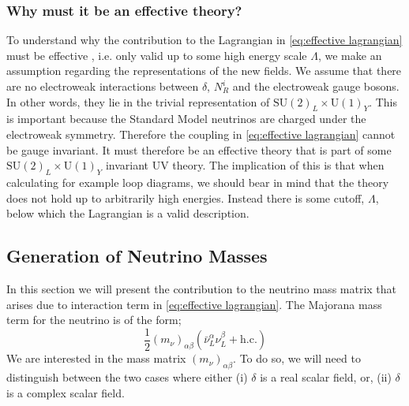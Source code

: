 \documentclass[11pt]{article}
\numberwithin{equation}{section}
\numberwithin{figure}{section}
\numberwithin{table}{section}
\newcommand{\SU}[1]{\textrm{SU}\left(#1\right)}
\newcommand{\Uni}[1]{\textrm{U}\left(#1\right)}
\begin{document}
\subsubsection{Why must it be an effective theory?}\label{sec:why effective}
To understand why the contribution to the Lagrangian in \eqref{eq:effective lagrangian} must be effective \cite{Farzan2009, Farzan2010a}, i.e. only valid up to some high energy scale $\Lambda$, we make an assumption regarding the representations of the new fields. We assume that there are no electroweak interactions between $\delta$, $N^i_R$ and the electroweak gauge bosons. In other words, they lie in the trivial representation of $\SU{2}_L \times \Uni{1}_Y$. This is important because the Standard Model neutrinos are charged under the electroweak symmetry. Therefore the coupling in \eqref{eq:effective lagrangian} cannot be gauge invariant. It must therefore be an effective theory that is part of some $\SU{2}_L \times \Uni{1}_Y$ invariant UV theory. The implication of this is that when calculating for example loop diagrams, we should bear in mind that the theory does not hold up to arbitrarily high energies. Instead there is some cutoff, $\Lambda$, below which the Lagrangian is a valid description.



\subsection{Generation of Neutrino Masses}



In this section we will present the contribution to the neutrino mass matrix that arises due to interaction term in \eqref{eq:effective lagrangian}. The Majorana mass term for the neutrino is of the form;
\begin{equation}\label{eq:neutrino mass}
  \frac{1}{2}(m_\nu)_{\alpha\beta}\left(\bar{\nu}^\alpha_L \nu^\beta_L + \text{h.c.}\right)
\end{equation}
We are interested in the mass matrix $(m_\nu)_{\alpha\beta}$. To do so, we will need to distinguish between the two cases where either (i) $\delta$ is a real scalar field, or, (ii) $\delta$ is a complex scalar field.
\end{document}
